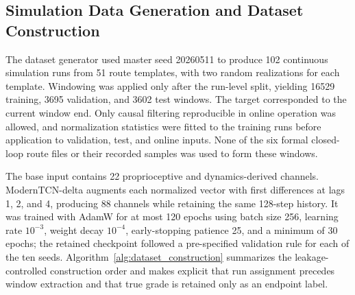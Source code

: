 \documentclass{ieeeaccess}
\begin{document}
\subsection{Simulation Data Generation and Dataset Construction}

The dataset generator used master seed 20260511 to produce 102 continuous simulation runs from 51 route templates, with two random realizations for each template. Windowing was applied only after the run-level split, yielding 16529 training, 3695 validation, and 3602 test windows. The target corresponded to the current window end. Only causal filtering reproducible in online operation was allowed, and normalization statistics were fitted to the training runs before application to validation, test, and online inputs. None of the six formal closed-loop route files or their recorded samples was used to form these windows.

The base input contains 22 proprioceptive and dynamics-derived channels. ModernTCN-delta augments each normalized vector with first differences at lags 1, 2, and 4, producing 88 channels while retaining the same 128-step history. It was trained with AdamW for at most 120 epochs using batch size 256, learning rate $10^{-3}$, weight decay $10^{-4}$, early-stopping patience 25, and a minimum of 30 epochs; the retained checkpoint followed a pre-specified validation rule for each of the ten seeds. Algorithm~\ref{alg:dataset_construction} summarizes the leakage-controlled construction order and makes explicit that run assignment precedes window extraction and that true grade is retained only as an endpoint label.
\end{document}
